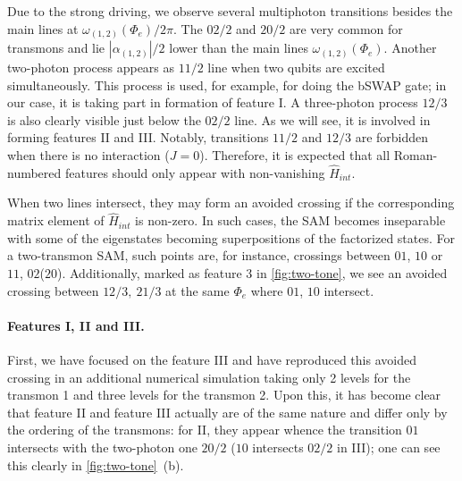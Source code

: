 \documentclass[%
 pra,
 amsmath,amssymb,
 reprint,%
]{revtex4-1}
\begin{document}
Due to the strong driving, we observe several multiphoton transitions besides the main lines at $\omega_{(1,2)}(\Phi_e)/2\pi$. The ${02/2}$ and ${20/2}$ are very common for transmons and lie $|\alpha_{(1,2)}|/2$ lower than the main lines $\omega_{(1,2)}(\Phi_e)$. Another two-photon process appears as $11/2$ line when two qubits are excited simultaneously. This process is used, for example, for doing the bSWAP gate\cite{poletto2012entanglement}; in our case, it is taking part in formation of feature I. A three-photon process $12/3$ is also clearly visible just below the $02/2$ line. As we will see, it is involved in forming features II and III. Notably, transitions $11/2$ and ${12/3}$ are forbidden when there is no interaction ($J=0$). Therefore, it is expected that all Roman-numbered features should only appear with non-vanishing $\hat H_{int}$.

When two lines intersect, they may form an avoided crossing if the corresponding matrix element of $\hat H_{int}$ is non-zero. In such cases, the SAM becomes inseparable with some of the eigenstates becoming superpositions of the factorized states. For a two-transmon SAM, such points are, for instance, crossings between ${01}$, ${10}$ or $ {11} $, $ {02} $($ {20} $). Additionally, marked as feature 3 in \autoref{fig:two-tone}, we see an avoided crossing between ${12}/3,\ {21}/3$ at the same $\Phi_e$ where ${01}$, ${10}$ intersect.


\paragraph{Features I, II and III.} First, we have focused on the feature III and have reproduced this avoided crossing in an additional numerical simulation taking only 2 levels for the transmon 1 and three levels for the transmon 2. Upon this, it has become clear that feature II and feature III actually are of the same nature and differ only by the ordering of the transmons: for II, they appear whence the transition ${01}$ intersects with the two-photon one ${20/2}$ (${10}$ intersects ${02/2}$ in III); one can see this clearly in \autoref{fig:two-tone}~(b).
\end{document}
